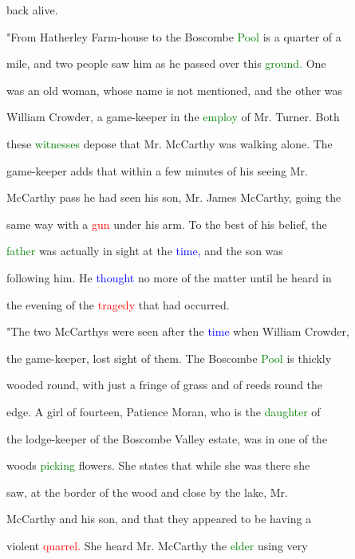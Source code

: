  back \textcolor{BurntOrange}{alive.}



 "From Hatherley Farm-house to the Boscombe \textcolor{green}{Pool} is a quarter of a

 mile, and two people saw him as he passed over this \textcolor{green}{ground.} One

 was an old woman, whose name is not mentioned, and the other was

 William Crowder, a game-keeper in the \textcolor{green}{employ} of Mr. Turner. Both

 these \textcolor{green}{witnesses} depose that Mr. McCarthy was walking alone. The

 game-keeper adds that within a few minutes of his seeing Mr.

 McCarthy pass he had seen his son, Mr. James McCarthy, going the

 same way with a \textcolor{red}{gun} under his arm. To the best of his belief, the

 \textcolor{green}{father} was actually in sight at the \textcolor{blue}{time,} and the son was

 following him. He \textcolor{blue}{thought} no more of the matter until he heard in

 the evening of the \textcolor{red}{tragedy} that had occurred.



 "The two McCarthys were seen after the \textcolor{blue}{time} when William Crowder,

 the game-keeper, \textcolor{BurntOrange}{lost} sight of them. The Boscombe \textcolor{green}{Pool} is thickly

 wooded round, with just a fringe of grass and of reeds round the

 edge. A girl of fourteen, \textcolor{BurntOrange}{Patience} Moran, who is the \textcolor{green}{daughter} of

 the lodge-keeper of the Boscombe Valley estate, was in one of the

 woods \textcolor{green}{picking} flowers. She states that while she was there she

 saw, at the border of the wood and close by the lake, Mr.

 McCarthy and his son, and that they appeared to be having a

 \textcolor{BurntOrange}{violent} \textcolor{red}{quarrel.} She heard Mr. McCarthy the \textcolor{green}{elder} using very

